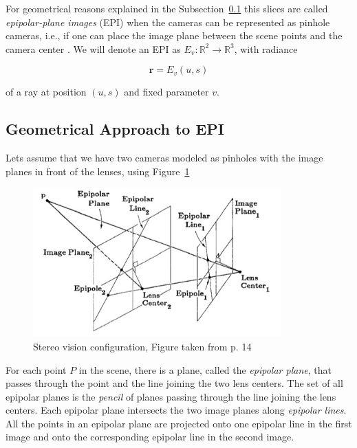 \bigskip

For geometrical reasons explained in the Subsection~\ref{subsec:GeoEPI} this slices are called \textit{epipolar-plane images} (EPI) when the cameras can be represented as pinhole cameras, i.e., if one can place the image plane between the scene points and the camera center \cite{Bolles}. We will denote an EPI as $E_v: \mathbb{R}^2\longrightarrow\mathbb{R}^3$, with radiance

\begin{equation}
\mathbf{r}=E_v(u,s)
\end{equation}

of a ray at position $(u,s)$ and fixed parameter $v$. 

\subsection{Geometrical Approach to EPI}
\label{subsec:GeoEPI}

Lets assume that we have two cameras modeled as pinholes with the image planes in front of the lenses, using Figure~\ref{fig:epipolarline}

\begin{figure}[h!]
\centering
\includegraphics[width = 0.85\textwidth]{./Diagrams/epipolarline.jpg}
\caption{Stereo vision configuration, Figure taken from \cite{Bolles} p. 14}
\label{fig:epipolarline}
\end{figure}

For each point $P$ in the scene, there is a plane, called the \textit{epipolar plane}, that passes through the point and the line joining the two lens centers. The set of all epipolar planes is the \textit{pencil} of planes passing through the line joining the lens centers. Each epipolar plane intersects the two image planes along \textit{epipolar lines}. All the points in an epipolar plane are projected onto one epipolar line in the first image and onto the corresponding epipolar line in the second image. 

